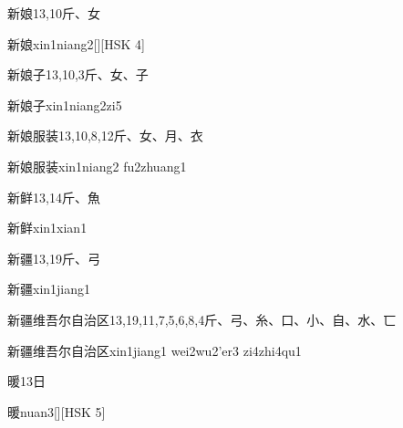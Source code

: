 \begin{entry}{新娘}{13,10}{⽄、⼥}
  \begin{phonetics}{新娘}{xin1niang2}[][HSK 4]
  \end{phonetics}
\end{entry}

\begin{entry}{新娘子}{13,10,3}{⽄、⼥、⼦}
  \begin{phonetics}{新娘子}{xin1niang2zi5}
  \end{phonetics}
\end{entry}

\begin{entry}{新娘服装}{13,10,8,12}{⽄、⼥、⽉、⾐}
  \begin{phonetics}{新娘服装}{xin1niang2 fu2zhuang1}
  \end{phonetics}
\end{entry}

\begin{entry}{新鲜}{13,14}{⽄、⿂}
  \begin{phonetics}{新鲜}{xin1xian1}
  \end{phonetics}
\end{entry}

\begin{entry}{新疆}{13,19}{⽄、⼸}
  \begin{phonetics}{新疆}{xin1jiang1}
  \end{phonetics}
\end{entry}

\begin{entry}{新疆维吾尔自治区}{13,19,11,7,5,6,8,4}{⽄、⼸、⽷、⼝、⼩、⾃、⽔、⼖}
  \begin{phonetics}{新疆维吾尔自治区}{xin1jiang1 wei2wu2'er3 zi4zhi4qu1}
  \end{phonetics}
\end{entry}

\begin{entry}{暖}{13}{⽇}
  \begin{phonetics}{暖}{nuan3}[][HSK 5]
  \end{phonetics}
\end{entry}

